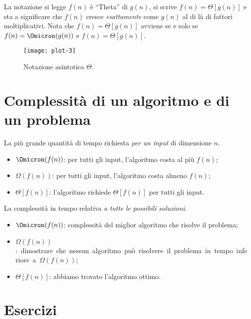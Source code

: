 La notazione si legge \(f(n)\) è \enquote{Theta} di \(g(n)\), si scrive \(f(n) = \Theta[g(n)]\) e sta a significare che \(f(n)\) cresce \emph{esattamente} come \(g(n)\) al di là di fattori moltiplicativi.
Nota che \(f(n) = \Theta[g(n)]\) avviene se e solo se \(f(n) = \Omicron(g(n))\) e \(f(n) = \Theta[g(n)]\).

\begin{figure}[H]\centering
	\texttt{[image: plot-3]}
	\caption{Notazione asintotica \(\Theta\).}
	\label{fig:plot-3}
\end{figure}

\section{Complessità di un algoritmo e di un problema}

\begin{definition*}
La più grande quantità di tempo richiesta \emph{per un input} di dimensione \(n\).
\end{definition*}
\begin{itemize}
	\item \(\Omicron(f(n))\): per tutti gli input, l'algoritmo costa al più \(f(n)\);
	\item \(\Omega(f(n))\): per tutti gli input, l'algoritmo costa almeno \(f(n)\);
	\item \(\Theta[f(n)]\): l'algoritmo richiede \(\Theta[f(n)]\) per tutti gli input.
\end{itemize}

\begin{definition*}
La complessità in tempo relativa \emph{a tutte le possibili soluzioni}.
\end{definition*}
\begin{itemize}
	\item \(\Omicron(f(n))\): complessità del miglior algoritmo che risolve il problema;
	\item \mbox{\(\Omega(f(n))\): dimostrare che nessun algoritmo può risolvere il problema in tempo inferiore a \(\Omega(f(n))\)};
	\item \(\Theta[f(n)]\): abbiamo trovato l'algoritmo ottimo.
\end{itemize}

\clearpage
\section{Esercizi}

